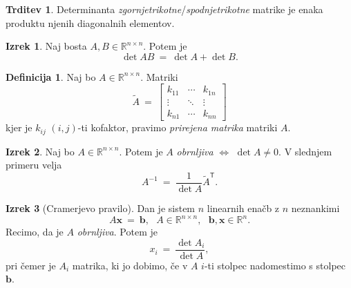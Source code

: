 \documentclass[11pt]{article}
\newcommand{\R}{\mathbb{R}}
\renewcommand{\b}{\mathbf{b}}
\newcommand{\x}{\mathbf{x}}
\newcommand{\0}{\mathbf{0}}
\newcommand{\T}{\mathsf{T}}
\theoremstyle{definition}
\newtheorem{definicija}{Definicija}[section]
\theoremstyle{definition}
\newtheorem{trditev}{Trditev}[section]
\theoremstyle{definition}
\newtheorem{izrek}{Izrek}[section]
\theoremstyle{definition}
\begin{document}
\begin{trditev}

Determinanta \textit{zgornjetrikotne}/\textit{spodnjetrikotne} matrike je enaka produktu njenih diagonalnih elementov.

\end{trditev}
\vspace{0.5cm}

\begin{izrek}

Naj bosta $A,B \in \R^{n \times n}$. Potem je
$$\det AB ~=~ \det A + \det B.$$

\end{izrek}
\vspace{0.5cm}

\begin{definicija}

Naj bo $A \in \R^{n \times n}$. Matriki
$$\tilde{A} ~=~ \begin{bmatrix}
k_{11} & \cdots & k_{1n} \\
\vdots & \ddots & \vdots \\
k_{n1} & \cdots & k_{nn}
\end{bmatrix}$$
kjer je $k_{ij}$ $(i,j)$-ti kofaktor, pravimo \textit{prirejena matrika} matriki $A$.

\end{definicija}
\vspace{0.5cm}

\begin{izrek}

Naj bo $A \in \R^{n \times n}$. Potem je $A$ \textit{obrnljiva} $\iff$ $\det A \neq 0$. V slednjem primeru velja
$$A^{-1} ~=~ \frac{1}{\det A} \tilde{A}^\T.$$

\end{izrek}
\vspace{0.5cm}

\begin{izrek}[Cramerjevo pravilo]

Dan je sistem $n$ linearnih enačb z $n$ neznankimi
$$A\x ~=~ \b, ~~~A \in \R^{n \times n}, ~~~\b,\x \in \R^n.$$
Recimo, da je $A$ \textit{obrnljiva}. Potem je
$$x_i ~=~ \frac{\det A_i}{\det A},$$
pri čemer je $A_i$ matrika, ki jo dobimo, če v $A$ $i$-ti stolpec nadomestimo s stolpec $\b$.

\end{izrek}
\vspace{0.5cm}

\end{document}
